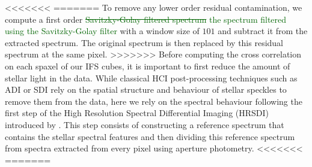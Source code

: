 \documentclass{aa}
\newcommand{\newchange}[1]{\textcolor{darkgreen}{#1}}
\begin{document}
{<<<<<<<
=======
To remove any lower order residual contamination, we compute a first order \newchange{\sout{Savitzky-Golay filtered spectrum } the spectrum filtered using the Savitzky-Golay filter \citep{1964SavitzkyGolay}} with a window size of $101$ and subtract it from the extracted spectrum. The original spectrum is then replaced by this residual spectrum at the same pixel.
>>>>>>>
Before computing the cross correlation on each spaxel of our IFS cubes, it is important to first reduce the amount of stellar light in the data. 
While classical HCI post-processing techniques such as ADI or SDI rely on the spatial structure and behaviour of stellar speckles to remove them from the data, here we rely on the spectral behaviour following the first step of the High Resolution Spectral Differential Imaging (HRSDI) introduced by \citet{2019Haffert}. 
This step consists of constructing a reference spectrum that contains the stellar spectral features and then dividing \citep[or subtracting, in the case of][]{2019Haffert} this reference spectrum from spectra extracted from every pixel using aperture photometry. 
<<<<<<<
=======
}
\end{document}
